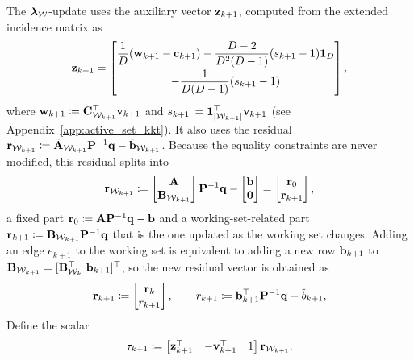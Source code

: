 The $\boldsymbol{\lambda}_\mathcal{W}$-update uses the auxiliary vector $\mathbf{z}_{k+1}$, computed from the extended incidence matrix as
\begin{equation}\label{eq:z_update_main}
	\mathbf{z}_{k+1}
	=
	\begin{bmatrix}
		\displaystyle\frac{1}{D}(\mathbf{w}_{k+1}-\mathbf{c}_{k+1})-\frac{D-2}{D^2(D-1)}(s_{k+1}-1)\mathbf{1}_D\\[8pt]
		\displaystyle-\frac{1}{D(D-1)}(s_{k+1}-1)
	\end{bmatrix},
\end{equation}
where $\mathbf{w}_{k+1}\coloneqq\mathbf{C}_{\mathcal{W}_{k+1}}^\top\mathbf{v}_{k+1}$ and $s_{k+1}\coloneqq\mathbf{1}_{|\mathcal{W}_{k+1}|}^\top\mathbf{v}_{k+1}$ (see Appendix~\ref{app:active_set_kkt}). It also uses the residual $\mathbf{r}_{\mathcal{W}_{k+1}}\coloneqq\tilde{\mathbf{A}}_{\mathcal{W}_{k+1}}\mathbf{P}^{-1}\mathbf{q} - \tilde{\mathbf{b}}_{\mathcal{W}_{k+1}}$. Because the equality constraints are never modified, this residual splits into
\begin{equation}
	\mathbf{r}_{\mathcal{W}_{k+1}}
	\coloneqq
	\begin{bmatrix}
		\mathbf{A} \\ \mathbf{B}_{\mathcal{W}_{k+1}}
	\end{bmatrix}\mathbf{P}^{-1}\mathbf{q} -
	\begin{bmatrix}
		\mathbf{b} \\ \mathbf{0}
	\end{bmatrix} =
	\begin{bmatrix}
		\mathbf{r}_0 \\
		\mathbf{r}_{k+1}
	\end{bmatrix},
\end{equation}
a fixed part $\mathbf{r}_0\coloneqq\mathbf{A}\mathbf{P}^{-1}\mathbf{q}-\mathbf{b}$ and a working-set-related part $\mathbf{r}_{k+1}\coloneqq\mathbf{B}_{\mathcal{W}_{k+1}}\mathbf{P}^{-1}\mathbf{q}$ that is the one updated as the working set changes. Adding an edge $e_{k+1}$ to the working set is equivalent to adding a new row $\mathbf{b}_{k+1}$ to $\B_{\mathcal{W}_{k+1}}=[\B_{\mathcal{W}_k}^\top\ \b_{k+1}]^\top$, so the new residual vector is obtained as
\begin{equation}
	\mathbf{r}_{k+1}
	\coloneqq
	\begin{bmatrix}
		\mathbf{r}_k \\ r_{k+1}
	\end{bmatrix},
	\qquad
	r_{k+1}\coloneqq \mathbf{b}_{k+1}^\top\mathbf{P}^{-1}\mathbf{q} - \tilde{b}_{k+1},
\end{equation}
Define the scalar
\begin{equation}
	\label{eq:tau_update}
	\tau_{k+1}
	\coloneqq
	\begin{bmatrix}
		\mathbf{z}_{k+1}^\top & -\mathbf{v}_{k+1}^\top & 1
	\end{bmatrix}
	\mathbf{r}_{\mathcal{W}_{k+1}}.
\end{equation}
